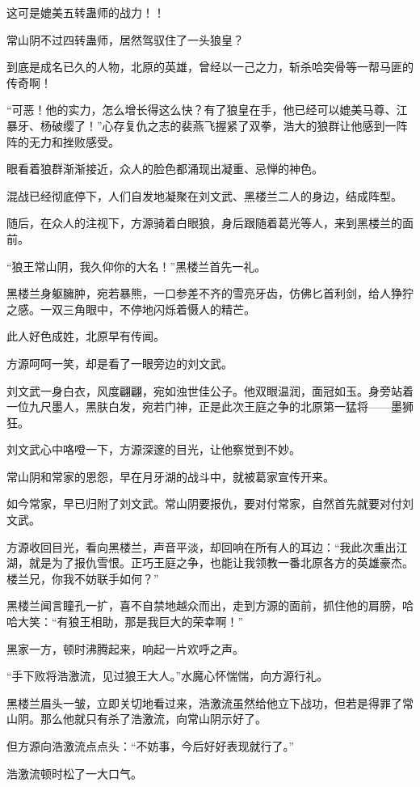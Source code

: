 \begin{this_body}
这可是媲美五转蛊师的战力！！

常山阴不过四转蛊师，居然驾驭住了一头狼皇？

到底是成名已久的人物，北原的英雄，曾经以一己之力，斩杀哈突骨等一帮马匪的传奇啊！

“可恶！他的实力，怎么增长得这么快？有了狼皇在手，他已经可以媲美马尊、江暴牙、杨破缨了！”心存复仇之志的裴燕飞握紧了双拳，浩大的狼群让他感到一阵阵的无力和挫败感受。

眼看着狼群渐渐接近，众人的脸色都涌现出凝重、忌惮的神色。

混战已经彻底停下，人们自发地凝聚在刘文武、黑楼兰二人的身边，结成阵型。

随后，在众人的注视下，方源骑着白眼狼，身后跟随着葛光等人，来到黑楼兰的面前。

“狼王常山阴，我久仰你的大名！”黑楼兰首先一礼。

黑楼兰身躯臃肿，宛若暴熊，一口参差不齐的雪亮牙齿，仿佛匕首利剑，给人狰狞之感。一双三角眼中，不停地闪烁着慑人的精芒。

此人好色成姓，北原早有传闻。

方源呵呵一笑，却是看了一眼旁边的刘文武。

刘文武一身白衣，风度翩翩，宛如浊世佳公子。他双眼温润，面冠如玉。身旁站着一位九尺墨人，黑肤白发，宛若门神，正是此次王庭之争的北原第一猛将——墨狮狂。

刘文武心中咯噔一下，方源深邃的目光，让他察觉到不妙。

常山阴和常家的恩怨，早在月牙湖的战斗中，就被葛家宣传开来。

如今常家，早已归附了刘文武。常山阴要报仇，要对付常家，自然首先就要对付刘文武。

方源收回目光，看向黑楼兰，声音平淡，却回响在所有人的耳边：“我此次重出江湖，就是为了报仇雪恨。正巧王庭之争，也能让我领教一番北原各方的英雄豪杰。楼兰兄，你我不妨联手如何？”

黑楼兰闻言瞳孔一扩，喜不自禁地越众而出，走到方源的面前，抓住他的肩膀，哈哈大笑：“有狼王相助，那是我巨大的荣幸啊！”

黑家一方，顿时沸腾起来，响起一片欢呼之声。

“手下败将浩激流，见过狼王大人。”水魔心怀惴惴，向方源行礼。

黑楼兰眉头一皱，立即关切地看过来，浩激流虽然给他立下战功，但若是得罪了常山阴。那么他就只有杀了浩激流，向常山阴示好了。

但方源向浩激流点点头：“不妨事，今后好好表现就行了。”

浩激流顿时松了一大口气。


\end{this_body}
